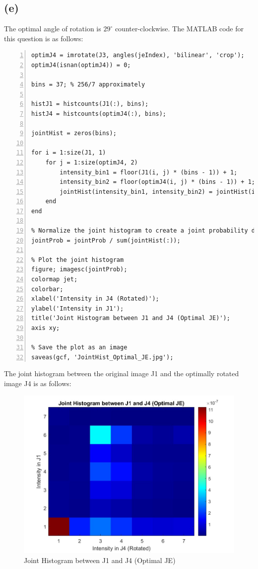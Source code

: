 \documentclass{article}
\begin{document}
\newpage
\subsection*{(e)}

The optimal angle of rotation is $29^{\circ}$ counter-clockwise. The MATLAB code for this question is as follows:
\begin{lstlisting}[frame=single,numbers=left,style=Matlab-Pyglike,breaklines=true,postbreak=\mbox{\textcolor{red}{$\hookrightarrow$}\space}]
optimJ4 = imrotate(J3, angles(jeIndex), 'bilinear', 'crop');
optimJ4(isnan(optimJ4)) = 0;

bins = 37; % 256/7 approximately

histJ1 = histcounts(J1(:), bins);
histJ4 = histcounts(optimJ4(:), bins);

jointHist = zeros(bins);

for i = 1:size(J1, 1)
    for j = 1:size(optimJ4, 2)
        intensity_bin1 = floor(J1(i, j) * (bins - 1)) + 1;
        intensity_bin2 = floor(optimJ4(i, j) * (bins - 1)) + 1;
        jointHist(intensity_bin1, intensity_bin2) = jointHist(intensity_bin1, intensity_bin2) + 1;
    end
end

% Normalize the joint histogram to create a joint probability distribution
jointProb = jointProb / sum(jointHist(:));

% Plot the joint histogram
figure; imagesc(jointProb);
colormap jet;
colorbar;
xlabel('Intensity in J4 (Rotated)');
ylabel('Intensity in J1');
title('Joint Histogram between J1 and J4 (Optimal JE)');
axis xy;
    
% Save the plot as an image
saveas(gcf, 'JointHist_Optimal_JE.jpg');
\end{lstlisting}

The joint histogram between the original image J1 and the optimally rotated image J4 is as follows:
\begin{figure}[H]
\centering
\includegraphics[scale=0.3]{./Q5/JointHist_Optimal_JE.jpg}
\caption{Joint Histogram between J1 and J4 (Optimal JE)}
\end{figure}
\end{document}
